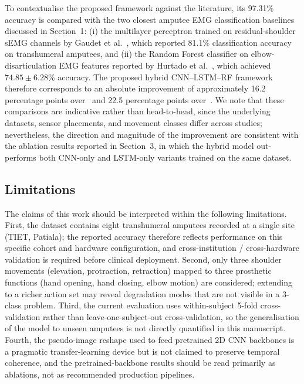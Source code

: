 \documentclass{elektr}
\newcommand{\yh}[1]{{\color{revhi}#1}}  %
\begin{document}
\yh{To contextualise the proposed framework against the literature, its 97.31\% accuracy is compared with the two closest amputee EMG classification baselines discussed in Section~1: (i) the multilayer perceptron trained on residual-shoulder sEMG channels by Gaudet et al.~\cite{gaudet2018classification}, which reported 81.1\% classification accuracy on transhumeral amputees, and (ii) the Random Forest classifier on elbow-disarticulation EMG features reported by Hurtado et al.~\cite{hurtado2024movements}, which achieved $74.85 \pm 6.28\%$ accuracy. The proposed hybrid CNN--LSTM--RF framework therefore corresponds to an absolute improvement of approximately 16.2 percentage points over~\cite{gaudet2018classification} and 22.5 percentage points over~\cite{hurtado2024movements}. We note that these comparisons are indicative rather than head-to-head, since the underlying datasets, sensor placements, and movement classes differ across studies; nevertheless, the direction and magnitude of the improvement are consistent with the ablation results reported in Section~3, in which the hybrid model out-performs both CNN-only and LSTM-only variants trained on the same dataset.}

\subsection*{Limitations}
\yh{The claims of this work should be interpreted within the following limitations. First, the dataset contains eight transhumeral amputees recorded at a single site (TIET, Patiala); the reported accuracy therefore reflects performance on this specific cohort and hardware configuration, and cross-institution / cross-hardware validation is required before clinical deployment. Second, only three shoulder movements (elevation, protraction, retraction) mapped to three prosthetic functions (hand opening, hand closing, elbow motion) are considered; extending to a richer action set may reveal degradation modes that are not visible in a 3-class problem. Third, the current evaluation uses within-subject 5-fold cross-validation rather than leave-one-subject-out cross-validation, so the generalisation of the model to unseen amputees is not directly quantified in this manuscript. Fourth, the pseudo-image reshape used to feed pretrained 2D CNN backbones is a pragmatic transfer-learning device but is not claimed to preserve temporal coherence, and the pretrained-backbone results should be read primarily as ablations, not as recommended production pipelines.}
\end{document}
